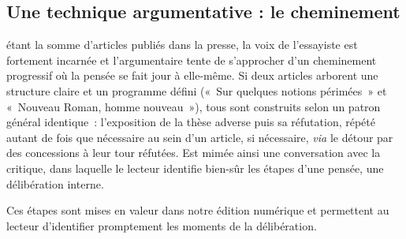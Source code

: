\documentclass[12pt, a4paper]{article}
\begin{document}
\subsection{Une technique argumentative : le cheminement}
\label{rhétoChemin}

\punr{} étant la somme d'articles publiés dans la presse, la voix de l'essayiste est fortement incarnée et l'argumentaire tente de s'approcher d'un cheminement progressif où la pensée se fait jour à elle-même. Si deux articles arborent une structure claire et un programme défini («~Sur quelques notions périmées~» et «~Nouveau Roman, homme nouveau~»), tous sont construits selon un patron général identique~: l'exposition de la thèse adverse puis sa réfutation, répété autant de fois que nécessaire au sein d'un article, si nécessaire, \textit{via} le détour par des concessions à leur tour réfutées. Est mimée ainsi une conversation avec la critique, dans laquelle le lecteur identifie bien-sûr les étapes d'une pensée, une délibération interne.

Ces étapes sont mises en valeur dans notre édition numérique et permettent au lecteur d'identifier promptement les moments de la délibération.

\end{document}
